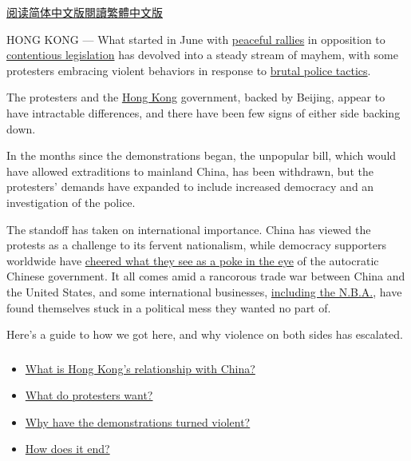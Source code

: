 \href{https://cn.nytimes3xbfgragh.onion/china/20191114/hong-kong-protests/}{阅读简体中文版}\href{https://cn.nytimes3xbfgragh.onion/china/20191114/hong-kong-protests/zh-hant/}{閱讀繁體中文版}

HONG KONG --- What started in June with
\href{https://www.nytimes3xbfgragh.onion/2019/06/09/world/asia/hong-kong-extradition-protest.html}{peaceful
rallies} in opposition to
\href{https://www.nytimes3xbfgragh.onion/2019/06/10/world/asia/hong-kong-extradition-bill.html}{contentious
legislation} has devolved into a steady stream of mayhem, with some
protesters embracing violent behaviors in response to
\href{https://www.nytimes3xbfgragh.onion/2019/09/22/world/hong-kong-police-protests.html}{brutal
police tactics}.

The protesters and the
\href{https://www.nytimes3xbfgragh.onion/2020/07/01/world/asia/hong-kong-purple-flag.html}{Hong
Kong} government, backed by Beijing, appear to have intractable
differences, and there have been few signs of either side backing down.

In the months since the demonstrations began, the unpopular bill, which
would have allowed extraditions to mainland China, has been withdrawn,
but the protesters' demands have expanded to include increased democracy
and an investigation of the police.

The standoff has taken on international importance. China has viewed the
protests as a challenge to its fervent nationalism, while democracy
supporters worldwide have
\href{https://www.nytimes3xbfgragh.onion/2019/11/03/world/asia/hong-kong-protesters-call-for-us-help-china-sees-a-conspiracy.html}{cheered
what they see as a poke in the eye} of the autocratic Chinese
government. It all comes amid a rancorous trade war between China and
the United States, and some international businesses,
\href{https://www.nytimes3xbfgragh.onion/2019/10/07/sports/basketball/nba-china-hong-kong.html}{including
the N.B.A.}, have found themselves stuck in a political mess they wanted
no part of.

Here's a guide to how we got here, and why violence on both sides has
escalated.

\subsubsection{}

\begin{itemize}
\tightlist
\item
  \protect\hyperlink{link-58d22028}{What is Hong Kong's relationship
  with China?}
\item
  \protect\hyperlink{link-334754bd}{What do protesters want?}
\item
  \protect\hyperlink{link-5173e263}{Why have the demonstrations turned
  violent?}
\item
  \protect\hyperlink{link-44447ff1}{How does it end?}
\end{itemize}

